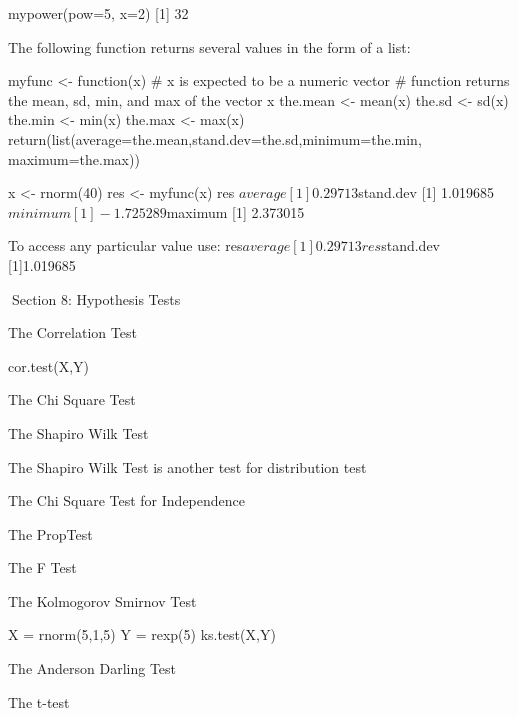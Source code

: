 \begin{frame}
\begin{frame}
mypower(pow=5, x=2)
[1] 32
 




The following function returns several values in the form of a list:



myfunc <- function(x)
{
# x is expected to be a numeric vector
# function returns the mean, sd, min, and max of the vector x
the.mean <- mean(x)
the.sd <- sd(x)
the.min <- min(x)
the.max <- max(x)
return(list(average=the.mean,stand.dev=the.sd,minimum=the.min,
maximum=the.max))
}
 



x <- rnorm(40)
res <- myfunc(x)
res
$average
[1] 0.29713
$stand.dev
[1] 1.019685
$minimum
[1] -1.725289
$maximum
[1] 2.373015






 


To access any particular value use:
res$average
[1] 0.29713
res$stand.dev
[1]1.019685







 
Section 8: Hypothesis Tests

The Correlation Test

cor.test(X,Y)


The Chi Square Test





The Shapiro Wilk Test

The Shapiro Wilk Test is another test for distribution test





The Chi Square Test for Independence





The PropTest





The F Test





The Kolmogorov Smirnov Test

X = rnorm(5,1,5)
Y = rexp(5)
ks.test(X,Y)


The Anderson Darling Test






The t-test








\end{frame}
\end{frame}
